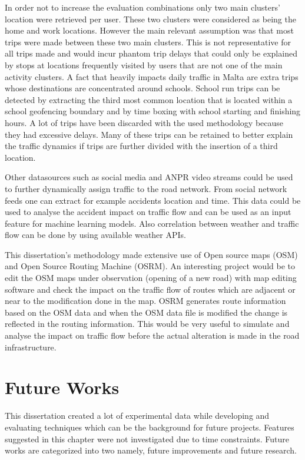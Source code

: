 \documentclass[12pt, a4paper]{report}
\theoremstyle{definition}
\theoremstyle{definition}%
\theoremstyle{definition}%
\theoremstyle{definition}%
\theoremstyle{definition}%
\theoremstyle{definition}%
\begin{document}
In order not to increase the evaluation combinations only two main clusters' location were retrieved per user. These two clusters were considered as being the home and work locations. However the main relevant assumption was that most trips were made between these two main clusters. This is not representative for all trips made and would incur phantom trip delays that could only be explained by stops at locations frequently visited by users that are not one of the main activity clusters. A fact that heavily impacts daily traffic in Malta are extra trips whose destinations are concentrated around schools. School run trips can be detected by extracting the third most common location that is located within a school geofencing boundary and by time boxing with school starting and finishing hours. A lot of trips have been discarded with the used methodology because they had excessive delays. Many of these trips can be retained to better explain the traffic dynamics if trips are further divided with the insertion of a third location.

Other datasources such as social media and ANPR video streams could be used to further dynamically assign traffic to the road network. From social network feeds one can extract for example accidents location and time. This data could be used to analyse the accident impact on traffic flow and can be used as an input feature for machine learning models. Also correlation between weather and traffic flow can be done by using available weather APIs.

This dissertation's methodology made extensive use of Open source maps (OSM) and Open Source Routing Machine (OSRM). An interesting project would be to edit the OSM maps under observation (opening of a new road) with map editing software and check the impact on the traffic flow of routes which are adjacent or near to the modification done in the map. OSRM generates route information based on the OSM data and when the OSM data file is modified the change is reflected in the routing information. This would be very useful to simulate and analyse the impact on traffic flow before the actual alteration is made in the road infrastructure. 

\chapter{Future Works} \label{chapter:future_work}

This dissertation created a lot of experimental data while developing and evaluating techniques which can be the background for future projects. Features suggested in this chapter were not investigated due to time constraints. Future works are categorized into two namely, future improvements and future research.
\end{document}
